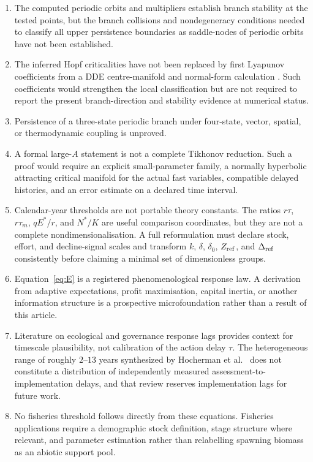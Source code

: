 \documentclass[11pt]{article}
\begin{document}
\begin{enumerate}
    \item The computed periodic orbits and multipliers establish branch stability at the tested points, but the branch collisions and nondegeneracy conditions needed to classify all upper persistence boundaries as saddle-nodes of periodic orbits have not been established.
    \item The inferred Hopf criticalities have not been replaced by first Lyapunov coefficients from a DDE centre-manifold and normal-form calculation \cite{hassard1981}. Such coefficients would strengthen the local classification but are not required to report the present branch-direction and stability evidence at numerical status.
    \item Persistence of a three-state periodic branch under four-state, vector, spatial, or thermodynamic coupling is unproved.
    \item A formal large-$A$ statement is not a complete Tikhonov reduction. Such a proof would require an explicit small-parameter family, a normally hyperbolic attracting critical manifold for the actual fast variables, compatible delayed histories, and an error estimate on a declared time interval.
    \item Calendar-year thresholds are not portable theory constants. The ratios $r\tau$, $r\tau_m$, $qE^*/r$, and $N^*/K$ are useful comparison coordinates, but they are not a complete nondimensionalisation. A full reformulation must declare stock, effort, and decline-signal scales and transform $k$, $\delta$, $\delta_0$, $Z_{\rm ref}$, and $\Delta_{\rm ref}$ consistently before claiming a minimal set of dimensionless groups.
    \item Equation~\eqref{eq:E} is a registered phenomenological response law. A derivation from adaptive expectations, profit maximisation, capital inertia, or another information structure is a prospective microfoundation rather than a result of this article.
    \item Literature on ecological and governance response lags provides context for timescale plausibility, not calibration of the action delay $\tau$. The heterogeneous range of roughly $2$--$13$ years synthesized by Hocherman et al.\ \cite{hocherman2025} does not constitute a distribution of independently measured assessment-to-implementation delays, and that review reserves implementation lags for future work.
    \item No fisheries threshold follows directly from these equations. Fisheries applications require a demographic stock definition, stage structure where relevant, and parameter estimation rather than relabelling spawning biomass as an abiotic support pool.
\end{enumerate}
\end{document}
